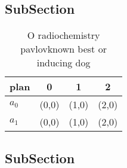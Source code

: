 \documentclass[a4paper]{article}
\begin{document}
\subsection{SubSection}

\begin{table}
\begin{adjustbox}{width=0.6\columnwidth}
\begin{tabular}{|l|l|l|l|}
\hline
\textbf{plan} & \multicolumn{1}{c|}{\textbf{0}} & \multicolumn{1}{c|}{\textbf{1}} & \multicolumn{1}{c|}{\textbf{2}} \\ \hline
\textbf{$a_0$}  & (0,0) & (1,0) & (2,0) \\ \hline
\textbf{$a_1$}  & (0,0) & (1,0) & (2,0) \\ \hline
\end{tabular}
\end{adjustbox}
\caption{O radiochemistry pavlovknown best or inducing dog
}
\end{table}

\subsection{SubSection}
\end{document}
